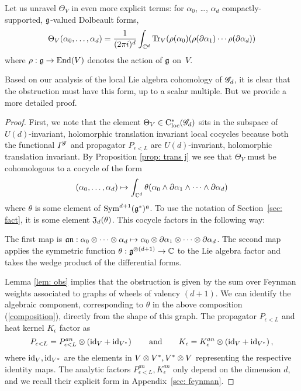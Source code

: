 Let us unravel $\Theta_V$ in even more explicit terms:
for $\alpha_0$, \dots, $\alpha_d$ compactly-supported, $\mathfrak g$-valued Dolbeault forms,
\[
\Theta_V(\alpha_0, \ldots, \alpha_d) = \frac{1}{(2\pi i)^d} \int_{\mathbb C^d} {\rm Tr}_V(\rho(\alpha_0) (\rho(\partial\alpha_1) \cdots \rho(\partial \alpha_d))
\]
where $\rho: \mathfrak g \to {\rm End}(V)$ denotes the action of $\mathfrak g$ on~$V$.

Based on our analysis of the local Lie algebra cohomology of $\mathscr G_d$, 
it is clear that the obstruction must have this form, up to a scalar multiple. 
But we provide a more detailed proof.

\begin{proof}
First, we note that the element $\Theta_V \in {\rm C}_{\rm loc}^*(\mathscr G_d)$ sits in the subspace of $U(d)$-invariant, holomorphic translation invariant local cocycles because both the functional $I^{\mathscr G}$ and propagator $P_{\epsilon<L}$ are $U(d)$-invariant, holomorphic translation invariant.
By Proposition \ref{prop: trans j} we see that $\Theta_V$ must be cohomologous to a cocycle of the form
\[
(\alpha_0, \ldots, \alpha_d) \mapsto \int_{\mathbb C^d} \theta(\alpha_0 \wedge \partial \alpha_1 \wedge \cdots \wedge \partial \alpha_d) 
\]
where $\theta$ is some element of ${\rm Sym}^{d+1}(\mathfrak g^*)^\mathfrak g$.
To use the notation of Section~\ref{sec: fact}, it is some element $\mathfrak J_d (\theta)$. 
This cocycle factors in the following way:
\beqn
\label{composition}
\eeqn
The first map is $\mathfrak a \mathfrak n : \alpha_0 \otimes \cdots \otimes \alpha_d \mapsto \alpha_0 \otimes \partial \alpha_1 \otimes \cdots \otimes \partial \alpha_d$.
The second map applies the symmetric function $\theta : \mathfrak g^{\otimes (d+1)} \to \mathbb C$ to the Lie algebra factor and takes the wedge product of the differential forms. 

Lemma \ref{lem: obs} implies that the obstruction is given by the sum over Feynman weights associated to graphs of wheels of valency $(d+1)$.
We can identify the algebraic component, corresponding to $\theta$ in the above composition (\ref{composition}), directly from the shape of this graph. 
The propagator $P_{\epsilon<L}$ and heat kernel $K_\epsilon$ factor as
\[
P_{\epsilon<L} = P^{an}_{\epsilon<L} \otimes \left({\rm id}_{V} + {\rm id}_{V^*}\right)
\quad\quad\text{and}\quad\quad 
K_{\epsilon} = K_{\epsilon}^{an} \otimes \left({\rm id}_{V} + {\rm id}_{V^*}\right),
\]
where ${\rm id}_V, {\rm id}_{V^*}$ are the elements in $V \otimes V^*, V^* \otimes V$ representing the respective identity maps. 
The analytic factors $P^{an}_{\epsilon<L},  K_{\epsilon}^{an}$ only depend on the dimension $d$, and we recall their explicit form in Appendix~\ref{sec: feynman}. 


\end{proof}
